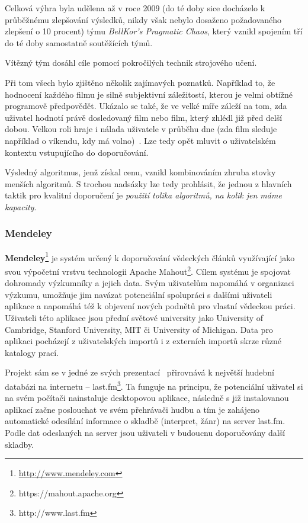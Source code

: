 \documentclass[thesis=M,czech]{FITthesis}[2014/05/07]
\begin{document}
Celková výhra byla udělena až v roce 2009 (do té doby sice docházelo k průběžnému zlepšování výsledků, nikdy však nebylo dosaženo požadovaného zlepšení o 10 procent) týmu \emph{BellKor's Pragmatic Chaos}, který vznikl spojením tří do té doby samostatně soutěžících týmů.

Vítězný tým dosáhl cíle pomocí pokročilých technik strojového učení.

Při tom všech bylo zjištěno několik zajímavých poznatků. Například to, že hodnocení každého filmu je silně subjektivní záležitostí, kterou je velmi obtížné programově předpovědět. Ukázalo se také, že ve velké míře záleží na tom, zda uživatel hodnotí právě dosledovaný film nebo film, který zhlédl již před delší dobou. Velkou roli hraje i nálada uživatele v průběhu dne (zda film sleduje například o víkendu, kdy má volno)~\cite{bellkor}. Lze tedy opět mluvit o uživatelském kontextu vstupujícího do doporučování.

Výsledný algoritmus, jenž získal cenu, vznikl kombinováním zhruba stovky menších algoritmů. S trochou nadsázky lze tedy prohlásit, že jednou z hlavních taktik pro kvalitní doporučení je \emph{použití tolika algoritmů, na kolik jen máme kapacity}.

\subsubsection{Mendeley}	
\label{mendeley}
\textbf{Mendeley}\footnote{\url{http://www.mendeley.com}} je systém určený k doporučování vědeckých článků využívající jako svou výpočetní vrstvu technologii Apache Mahout\footnote{https://mahout.apache.org}. Cílem systému je spojovat dohromady výzkumníky a jejich data. Svým uživatelům napomáhá v organizaci výzkumu, umožňuje jim navázat potenciální spolupráci s dalšími uživateli aplikace a napomáhá též k objevení nových podnětů pro vlastní vědeckou práci. Uživateli této aplikace jsou přední světové university jako University of Cambridge, Stanford University, MIT či University of Michigan. Data pro aplikaci pocházejí z uživatelských importů i z externích importů skrze různé katalogy prací. 

Projekt sám se v jedné ze svých prezentací~\cite{mendeleylastfm} přirovnává k největší hudební databázi na internetu – last.fm\footnote{http://www.last.fm}. Ta funguje na principu, že potenciální uživatel si na svém počítači nainstaluje desktopovou aplikace, následně s již instalovanou aplikací začne poslouchat ve svém přehrávači hudbu a tím je zahájeno automatické odesílání informace o skladbě (interpret, žánr) na server last.fm. Podle dat odeslaných na server jsou uživateli v budoucnu doporučovány další skladby. 
\end{document}
